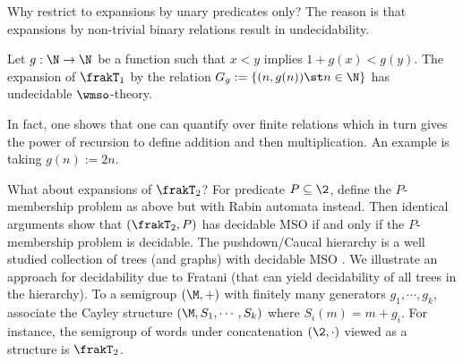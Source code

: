 Why restrict to expansions by unary predicates only? The reason is that expansions by non-trivial binary relations result in undecidability. 

\begin{theorem} \cite{ElRa66}
Let $g:\N \to \N$ be a function such that $x < y$ implies $1 + g(x) < g(y)$.
The expansion of $\frakT_1$ by the relation $G_g:= \{(n,g(n)) \st n \in \N\}$ has undecidable $\wmso$-theory.
\end{theorem}

In fact, one shows that one can quantify over finite relations which in turn gives the power of recursion to define addition and then multiplication.
An example is taking $g(n) := 2n$.


What about expansions of $\frakT_2$? For predicate $P \subseteq \2$, define the $P$-membership problem as above but with Rabin automata instead. Then identical arguments show that $(\frakT_2,P)$ has decidable MSO if and only if the $P$-membership problem is decidable.  The pushdown/Caucal hierarchy is a well studied collection of trees (and graphs) 
with decidable MSO \cite{Cauc02} \cite{Thom03}. We illustrate an approach for decidability due to Fratani \cite{Frat05} (that can yield decidability of all trees in the hierarchy). To a semigroup $(\M,+)$ with finitely many generators $g_1,\cdots,g_k$, associate the Cayley structure 
$(\M,S_1,\cdots,S_k)$ where $S_i(m) = m+ g_i$. For instance, the semigroup of words under concatenation $(\2,\cdot)$ viewed as a structure is
$\frakT_2$.  


